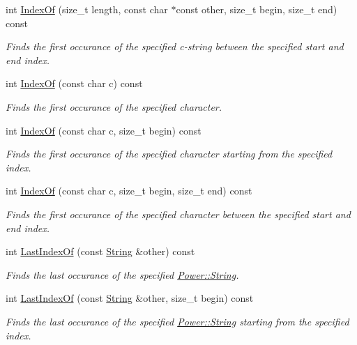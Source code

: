 \begin{DoxyCompactItemize}
int \hyperlink{class_power_1_1_string_a6dbad87edb4036a9463399cfea31a14c}{Index\+Of} (size\+\_\+t length, const char $\ast$const other, size\+\_\+t begin, size\+\_\+t end) const
\begin{DoxyCompactList}\small\item\em Finds the first occurance of the specified c-\/string between the specified start and end index. \end{DoxyCompactList}\item 
int \hyperlink{class_power_1_1_string_af1bd7ca5bdef376538e580fd61d7fb1d}{Index\+Of} (const char c) const
\begin{DoxyCompactList}\small\item\em Finds the first occurance of the specified character. \end{DoxyCompactList}\item 
int \hyperlink{class_power_1_1_string_aafddc2ae8eeb214985e63ccb0aef162c}{Index\+Of} (const char c, size\+\_\+t begin) const
\begin{DoxyCompactList}\small\item\em Finds the first occurance of the specified character starting from the specified index. \end{DoxyCompactList}\item 
int \hyperlink{class_power_1_1_string_acbdc3ba090c08065559d9ab32b753e27}{Index\+Of} (const char c, size\+\_\+t begin, size\+\_\+t end) const
\begin{DoxyCompactList}\small\item\em Finds the first occurance of the specified character between the specified start and end index. \end{DoxyCompactList}\item 
int \hyperlink{class_power_1_1_string_a5a87bca075e813615b7a547fa9a92b65}{Last\+Index\+Of} (const \hyperlink{class_power_1_1_string}{String} \&other) const
\begin{DoxyCompactList}\small\item\em Finds the last occurance of the specified \hyperlink{class_power_1_1_string}{Power\+::\+String}. \end{DoxyCompactList}\item 
int \hyperlink{class_power_1_1_string_a1f885622a6a35b48c3d2be7334c26433}{Last\+Index\+Of} (const \hyperlink{class_power_1_1_string}{String} \&other, size\+\_\+t begin) const
\begin{DoxyCompactList}\small\item\em Finds the last occurance of the specified \hyperlink{class_power_1_1_string}{Power\+::\+String} starting from the specified index. \end{DoxyCompactList}\item 

\end{DoxyCompactItemize}
